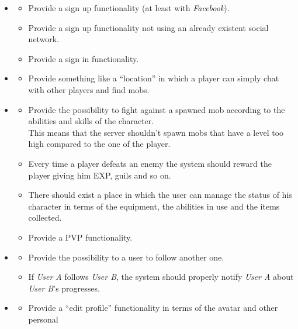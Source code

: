 	\begin{itemize}
		\item \textbf{\goalSignup}
			\begin{itemize}
				\item Provide a sign up functionality (at least with \textit{Facebook}).
				\item Provide a sign up functionality not using an already existent social network.
				\item Provide a sign in functionality.
			\end{itemize}
		\item \textbf{\goalExplore}
			\begin{itemize}
				\item Provide something like a ``location'' in which a player can simply chat with 
				other players and find mobs.
			\end{itemize}
		\item \textbf{\goalSkill}
			\begin{itemize}
				\item Provide the possibility to fight against a spawned mob according to the abilities and 
				skills of the character.\\
				This means that the server shouldn't spawn mobs that have a level too high compared to the one 
				of the player.
				\item Every time a player defeats an enemy the system should reward the player giving him 
				EXP, guils and so on.
				\item There should exist a place in which the user can manage the status of his character in terms of 
				the equipment, the abilities in use and the items collected.
				\item Provide a PVP functionality.
			\end{itemize}
		\item \textbf{\goalFollow}
			\begin{itemize}
				\item Provide the possibility to a user to follow another one.
				\item If \textit{User A} follows \textit{User B}, the system should properly notify 
				\textit{User A} about \textit{User B}'s progresses.
			\end{itemize}
		\item \textbf{\goalProfile}
			\begin{itemize}
				\item Provide a ``edit profile'' functionality in terms of the avatar and other personal 

\end{itemize}
\end{itemize}
